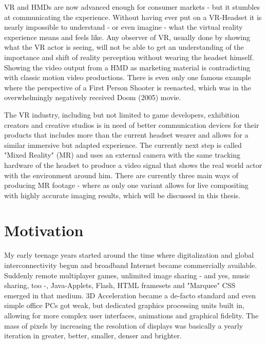 VR and HMDs are now advanced enough for consumer markets - but it stumbles at 
communicating the experience. Without having ever put on a VR-Headset it is 
nearly impossible to understand - or even imagine - what the virtual reality 
experience means and feels like. Any observer of VR, usually done by showing 
what the VR actor is seeing, will not be able to get an understanding of the 
importance and shift of reality perception without wearing the headset himself.
\newline
Showing the video output from a HMD as marketing material is contradicting with 
classic motion video productions. There is even only one famous example where 
the perspective of a First Person Shooter is reenacted, which was in the 
overwhelmingly negatively received Doom (2005) movie.

The VR industry, including but not limited to game developers, exhibition 
creators and creative studios is in need of better communication devices for 
their products that includes more than the current headset wearer and allows 
for a similar immersive but adapted experience.
\newline
The currently next step is called "Mixed Reality" (MR) and uses an external 
camera with the same tracking hardware of the headset to produce a video signal 
that shows the real world actor with the environment around him. There are 
currently three main ways of producing MR footage - where as only one variant 
allows for live compositing with highly accurate imaging results, which will be 
discussed in this thesis.

\section{Motivation}
\label{sec:intro:motivation}

My early teenage years started around the time where digitalization and global
interconnectivity begun and broadband Internet became commercially available.
Suddenly remote multiplayer games, unlimited image sharing - and yes, music
sharing, too -, Java-Applets, Flash, HTML framesets and "Marquee" CSS emerged in
that medium. 3D Acceleration became a de-facto standard and even simple office
PCs got weak, but dedicated graphics processing units built in, allowing for 
more complex user interfaces, animations and graphical fidelity. The mass of 
pixels by increasing the resolution of displays was basically a yearly 
iteration in greater, better, smaller, denser and brighter.

